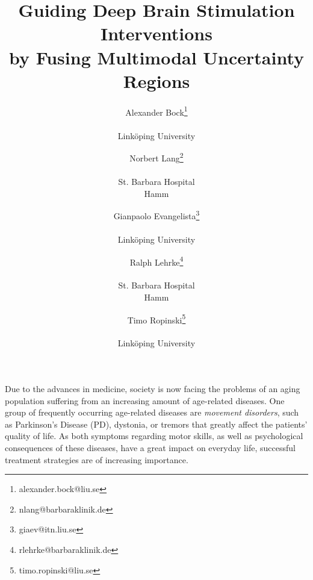 \documentclass[review]{vgtc}                 %
\title{Guiding Deep Brain Stimulation Interventions \\ by Fusing Multimodal Uncertainty Regions}
\author{Alexander Bock\thanks{alexander.bock@liu.se} \\ %
	\parbox{1in}{\scriptsize \centering Link\"oping University}
\and Norbert Lang\thanks{nlang@barbaraklinik.de} \\ %
	\parbox{1in}{\scriptsize \centering St. Barbara Hospital \\ Hamm}
\and Gianpaolo Evangelista\thanks{giaev@itn.liu.se} \\ %
	\parbox{1in}{\scriptsize \centering Link\"oping University}
\and Ralph Lehrke\thanks{rlehrke@barbaraklinik.de} \\ %
	\parbox{1in}{\scriptsize \centering St. Barbara Hospital \\ Hamm}
\and Timo Ropinski\thanks{timo.ropinski@liu.se} \\ %
	\parbox{1in}{\scriptsize \centering Link\"oping University}
}
\begin{document}
\label{sec:introduction}

\maketitle

Due to the advances in medicine, society is now facing the problems of an aging population suffering from an increasing amount of age-related diseases. One group of frequently occurring age-related diseases are \emph{movement disorders}, such as Parkinson's Disease (PD), dystonia, or tremors that greatly affect the patients' quality of life. As both symptoms regarding motor skills, as well as psychological consequences of these diseases, have a great impact on everyday life, successful treatment strategies are of increasing importance.
\end{document}
